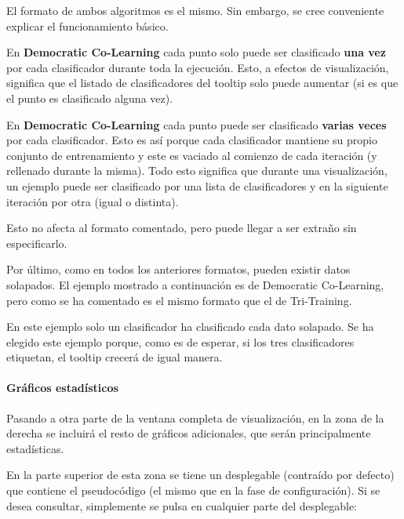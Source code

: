 El formato de ambos algoritmos es el mismo. Sin embargo, se cree conveniente
explicar el funcionamiento básico.

En \textbf{Democratic Co-Learning} cada punto solo puede ser clasificado
\textbf{una vez} por cada clasificador durante toda la ejecución. Esto, a
efectos de visualización, significa que el listado de clasificadores del tooltip
solo puede aumentar (si es que el punto es clasificado alguna vez).

En \textbf{Democratic Co-Learning} cada punto puede ser clasificado
\textbf{varias veces} por cada clasificador. Esto es así porque cada
clasificador mantiene su propio conjunto de entrenamiento y este es vaciado al
comienzo de cada iteración (y rellenado durante la misma). Todo esto significa
que durante una visualización, un ejemplo puede ser clasificado por una lista de
clasificadores y en la siguiente iteración por otra (igual o distinta).

Esto no afecta al formato comentado, pero puede llegar a ser extraño sin
especificarlo.

Por último, como en todos los anteriores formatos, pueden existir datos
solapados. El ejemplo mostrado a continuación es de Democratic Co-Learning, pero
como se ha comentado es el mismo formato que el de Tri-Training.


En este ejemplo solo un clasificador ha clasificado cada dato solapado. Se ha
elegido este ejemplo porque, como es de esperar, si los tres clasificadores
etiquetan, el tooltip crecerá de igual manera.

\paragraph{Gráficos estadísticos} Pasando a otra parte de la ventana completa de
visualización, en la zona de la derecha se incluirá el resto de gráficos
adicionales, que serán principalmente estadísticas.


En la parte superior de esta zona se tiene un desplegable (contraído por
defecto) que contiene el pseudocódigo (el mismo que en la fase de
configuración). Si se desea consultar, simplemente se pulsa en cualquier parte
del desplegable:


